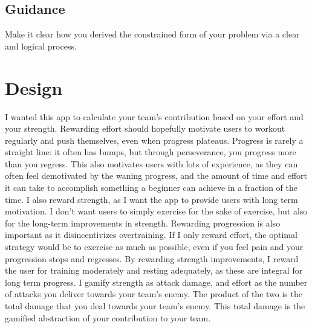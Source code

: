 \documentclass{l4proj}
\begin{document}
\section{Guidance}
Make it clear how you derived the constrained form of your problem via a clear and logical process. 

\chapter{Design}
I wanted this app to calculate your team's contribution based on your effort and your strength. Rewarding effort should hopefully motivate users to workout regularly and push themselves, even when progress plateaus. Progress is rarely a straight line: it often has bumps, but through perseverance, you progress more than you regress. This also motivates users with lots of experience, as they can often feel demotivated by the waning progress, and the amount of time and effort it can take to accomplish something a beginner can achieve in a fraction of the time. I also reward strength, as I want the app to provide users with long term motivation. I don't want users to simply exercise for the sake of exercise, but also for the long-term improvements in strength. Rewarding progression is also important as it disincentivizes overtraining. If I only reward effort, the optimal strategy would be to exercise as much as possible, even if you feel pain and your progression stops and regresses. By rewarding strength improvements, I reward the user for training moderately and resting adequately, as these are integral for long term progress. I gamify strength as attack damage, and effort as the number of attacks you deliver towards your team's enemy. The product of the two is the total damage that you deal towards your team's enemy. This total damage is the gamified abstraction of your contribution to your team.
\end{document}
